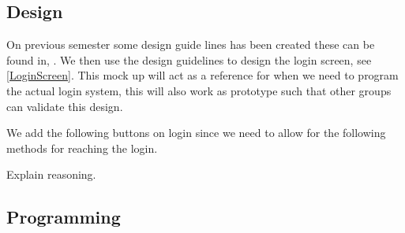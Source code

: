\subsection{Design}

On previous semester some design guide lines has been created these can be
found in, . We then use the design
guidelines to design the login screen, see \autoref{LoginScreen}. This mock up
will act as a reference for when we need to program the actual login system,
this will also work as prototype such that other groups can validate this
design. 

We add the following buttons on login since we need to allow for the
following methods for reaching the login.


Explain reasoning.

\subsection{Programming}




